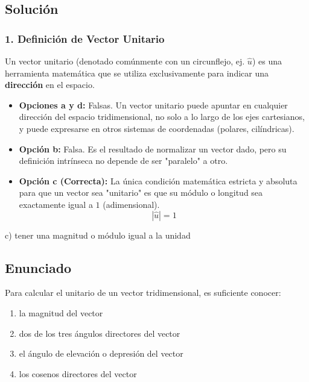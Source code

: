 \documentclass[12pt, a4paper]{article}
\begin{document}
\subsection*{Solución}

\subsubsection*{1. Definición de Vector Unitario}
Un vector unitario (denotado comúnmente con un circunflejo, ej. $\hat{u}$) es una herramienta matemática que se utiliza exclusivamente para indicar una \textbf{dirección} en el espacio.
\begin{itemize}
    \item \textbf{Opciones a y d:} Falsas. Un vector unitario puede apuntar en cualquier dirección del espacio tridimensional, no solo a lo largo de los ejes cartesianos, y puede expresarse en otros sistemas de coordenadas (polares, cilíndricas).
    \item \textbf{Opción b:} Falsa. Es el resultado de normalizar un vector dado, pero su definición intrínseca no depende de ser "paralelo" a otro.
    \item \textbf{Opción c (Correcta):} La única condición matemática estricta y absoluta para que un vector sea "unitario" es que su módulo o longitud sea exactamente igual a $1$ (adimensional).
    $$ |\hat{u}| = 1 $$
\end{itemize}

\begin{tcolorbox}[colback=green!5!white, colframe=green!50!black, title=Respuesta Final]
\centering \Large c) tener una magnitud o módulo igual a la unidad
\end{tcolorbox}

\newpage


\subsection*{Enunciado}
Para calcular el unitario de un vector tridimensional, es suficiente conocer:
\begin{enumerate}[label=\alph*)]
    \item la magnitud del vector
    \item dos de los tres ángulos directores del vector
    \item el ángulo de elevación o depresión del vector
    \item los cosenos directores del vector
\end{enumerate}
\end{document}
